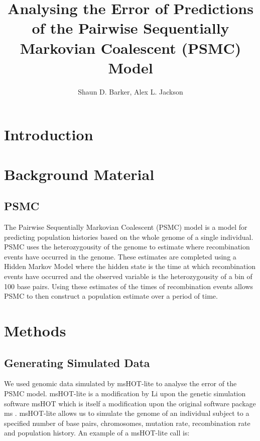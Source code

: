 \documentclass[11pt,a4paper]{article}
\title{Analysing the Error of Predictions of the Pairwise Sequentially Markovian Coalescent (PSMC) Model}
\author{Shaun D. Barker, Alex L. Jackson}
\begin{document}
\maketitle

\begin{abstract}

\end{abstract}
\section{Introduction}
\section{Background Material}
\subsection{PSMC}
The Pairwise Sequentially Markovian Coalescent (PSMC) model \cite{li2011inference} is a model for predicting population histories based on the whole genome of a single individual. PSMC uses the heterozygousity of the genome to estimate where recombination events have occurred in the genome. These estimates are completed using a Hidden Markov Model where the hidden state is the time at which recombination events have occurred and the observed variable is the heterozygousity of a bin of 100 base pairs. Using these estimates of the times of recombination events allows PSMC to then construct a population estimate over a period of time. 

\section{Methods}\label{sec:methods}
\subsection{Generating Simulated Data} %
We used genomic data simulated by msHOT-lite \cite{mshotlite} to analyse the error of the PSMC model. msHOT-lite is a modification by Li upon the genetic simulation software msHOT \cite{hellenthal2007mshot} which is itself a modification upon the original software package ms \cite{hudson2002generating}. msHOT-lite allows us to simulate the genome of an individual subject to a specified number of base pairs, chromosomes, mutation rate, recombination rate and population history. 
An example of a msHOT-lite call is: 
\end{document}

